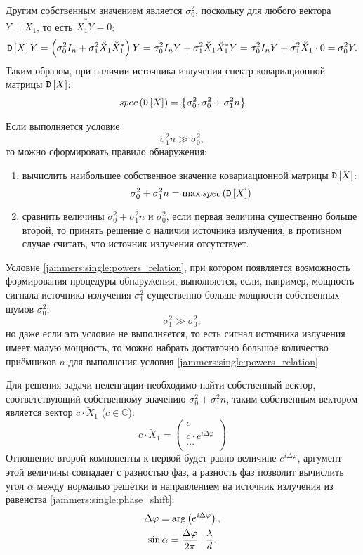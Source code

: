 Другим собственным значением является $\sigma_0^2$, поскольку для любого вектора $Y \perp \breve{X}_1$, то есть $\breve{X}_1^* Y = 0$:
\[
    \mathtt{D} \left [ X \right ] Y
    = \left ( \sigma_0^2 I_n + \sigma_1^2 \breve{X}_1 \breve{X}_1^* \right ) Y
    = \sigma_0^2 I_n Y + \sigma_1^2 \breve{X}_1 \breve{X}_1^* Y
    = \sigma_0^2 I_n Y + \sigma_1^2 \breve{X}_1 \cdot 0
    = \sigma_0^2 Y .
\]
Таким образом, при наличии источника излучения спектр ковариационной матрицы $\mathtt{D} \left [ X \right ]$:
\[
    spec \left ( \mathtt{D} \left [ X \right ] \right ) = \left \{ \sigma_0^2, \sigma_0^2 + \sigma_1^2 n \right \}
\]

Если выполняется условие
\begin{equation}
    \label{jammers:single:powers_relation}
    \sigma_1^2 n \gg \sigma_0^2 ,
\end{equation}
то можно сформировать правило обнаружения:
\begin{enumerate}
    \item вычислить наибольшее собственное значение ковариационной матрицы $\mathtt{D} \left [ X \right ]$:
    \[
        \sigma_0^2 + \sigma_1^2 n = \max spec \left ( \mathtt{D} \left [ X \right ] \right )
    \]
    \item сравнить величины $\sigma_0^2 + \sigma_1^2 n$ и $\sigma_0^2$, если первая величина существенно больше второй, то принять решение о наличии источника
    излучения, в противном случае считать, что источник излучения отсутствует.
\end{enumerate}

Условие \eqref{jammers:single:powers_relation}, при котором появляется возможность формирования процедуры обнаружения, выполняется, если, например, мощность
сигнала источника излучения $\sigma_1^2$ существенно больше мощности собственных шумов $\sigma_0^2$:
\[
    \sigma_1^2 \gg \sigma_0^2 ,
\]
но даже если это условие не выполняется, то есть сигнал источника излучения имеет малую мощность, то можно набрать достаточно большое количество приёмников $n$
для выполнения условия \eqref{jammers:single:powers_relation}.

Для решения задачи пеленгации необходимо найти собственный вектор, соответствующий собственному значению $\sigma_0^2 + \sigma_1^2 n$, таким собственным вектором
является вектор $c \cdot \breve{X}_1$ ($c \in \mathbb{C}$):
\[
    c \cdot \breve{X}_1
    = \begin{pmatrix}
          c                            \\
          c \cdot e^{i \Delta \varphi} \\
          ...                          \\
    \end{pmatrix}
\]
Отношение второй компоненты к первой будет равно величине $e^{i \Delta \varphi}$, аргумент этой величины совпадает с разностью фаз, а разность фаз позволит вычислить угол $\alpha$
между нормалью решётки и направлением на источник излучения из равенства \eqref{jammers:single:phase_shift}:
\begin{gather}
    \Delta \varphi = \arg \left ( e^{i \Delta \varphi} \right ), \notag \\
    \sin \alpha = \frac{\Delta \varphi}{2 \pi} \cdot \frac{\lambda}{d} \label{jammers:single:angle}.
\end{gather}


